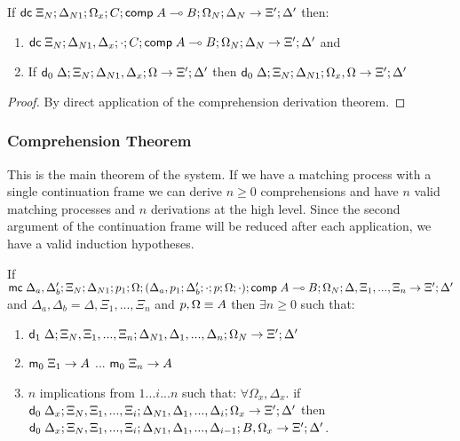 If $\mathsf{dc} \; \Xi_N; \Delta_{N1}; \Omega_x; C; \mathsf{comp} \; A \multimap B; \Omega_N; \Delta_N \rightarrow \Xi'; \Delta'$ then:
\begin{enumerate}
   \item $\mathsf{dc} \; \Xi_N; \Delta_{N1}, \Delta_x; \cdot; C; \mathsf{comp} \; A \multimap B; \Omega_N; \Delta_N \rightarrow \Xi'; \Delta'$ and
   \item If $\mathsf{d}_0 \; \Delta; \Xi_N; \Delta_{N1}, \Delta_x; \Omega \rightarrow \Xi'; \Delta'$ then $\mathsf{d}_0 \; \Delta; \Xi_N; \Delta_{N1}; \Omega_x, \Omega \rightarrow \Xi'; \Delta'$
\end{enumerate}

\begin{proof}
   By direct application of the comprehension derivation theorem.
\end{proof}

\subsubsection{Comprehension Theorem}

This is the main theorem of the system. If we have a matching process with a single continuation frame we can derive $n \geq 0$ comprehensions and have $n$ valid matching processes and $n$ derivations at the high level.
Since the second argument of the continuation frame will be reduced after each application, we have a valid induction hypotheses.

If $\mathsf{mc} \; \Delta_a, \Delta'_b; \Xi_N; \Delta_{N1}; p_1; \Omega; (\Delta_a, p_1; \Delta'_b; \cdot; p; \Omega; \cdot); \mathsf{comp} \; A \multimap B; \Omega_N; \Delta, \Xi_1, ..., \Xi_n \rightarrow \Xi'; \Delta'$ and $\Delta_a, \Delta_b = \Delta, \Xi_1, ..., \Xi_n$ and $p, \Omega \equiv A$ then $\exists n \geq 0$ such that:
\begin{enumerate}
   \item $\mathsf{d}_1 \; \Delta; \Xi_N, \Xi_1, ..., \Xi_n; \Delta_{N1}, \Delta_1, ..., \Delta_n; \Omega_N \rightarrow \Xi'; \Delta'$
   \item $\mathsf{m}_0 \; \Xi_1 \rightarrow A$ ... $\mathsf{m}_0 \; \Xi_n \rightarrow A$
   \item $n$ implications from $1 ... i ... n$ such that: $\forall \Omega_x, \Delta_x.$ if $\mathsf{d}_0 \; \Delta_x; \Xi_N, \Xi_1, ..., \Xi_i; \Delta_{N1}, \Delta_1, ..., \Delta_i; \Omega_x \rightarrow \Xi'; \Delta'$ then $\mathsf{d}_0 \; \Delta_x; \Xi_N, \Xi_1, ..., \Xi_i; \Delta_{N1}, \Delta_1, ..., \Delta_{i-1}; B, \Omega_x \rightarrow \Xi'; \Delta'$.
\end{enumerate}

